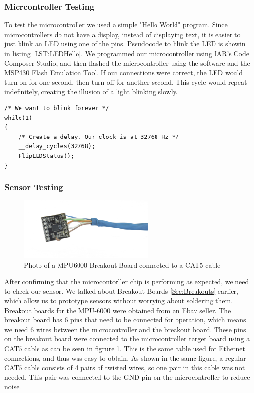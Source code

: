 \subsubsection{Micrcontroller Testing}
To test the microcontroller we used a simple "Hello World" program.
Since microcontrollers do not have a display, instead of displaying text,
it is easier to just blink an LED using one of the pins.
Pseudocode to blink the LED is showin in listing \ref{LST:LEDHello}.
We programmed our microcontroller using IAR's Code Composer Studio,
and then flashed the microcontroller using the software and the MSP430 Flash Emulation Tool.
If our connections were correct,
the LED would turn on for one second,
then turn off for another second.
This cycle would repeat indefinitely, creating the illusion of a light blinking slowly.
\begin{lstlisting}[caption=My caption,label=LST:LEDHello]
/* We want to blink forever */
while(1)
{
	/* Create a delay. Our clock is at 32768 Hz */
	__delay_cycles(32768);
	FlipLEDStatus();  
}
\end{lstlisting}


\subsubsection{Sensor Testing}
\label{Sec:SensorTesting}
\begin{figure}
\begin{center}
\includegraphics[width=0.6\textwidth]{images/CAT6MPU.jpg}
\caption{Photo of a MPU6000 Breakout Board connected to a CAT5 cable}
\label{Fig:CAt5MPU}
\end{center}
\end{figure}

After confirming that the microcontorller chip is performing as expected,
we need to check our sensor. We talked about Breakout Boards \ref{Sec:Breakouts} earlier,
which allow us to prototype sensors without worrying about soldering them.
Breakout boards for the MPU-6000 were obtained from an Ebay seller.
The breakout board has 6 pins that need to be connected for operation,
which means we need 6 wires between the microcontroller and the breakout board.
These pins on the breakout board were connected to the microcontroller target board using a CAT5 cable as can be seen in figrure \ref{Fig:CAt5MPU}.
This is the same cable used for Ethernet connections, and thus was easy to obtain.
As shown in the same figure,
a regular CAT5 cable consists of 4 pairs of twisted wires,
so one pair in this cable was not needed.
This pair was connected to the GND pin on the microcontroller to reduce noise.

